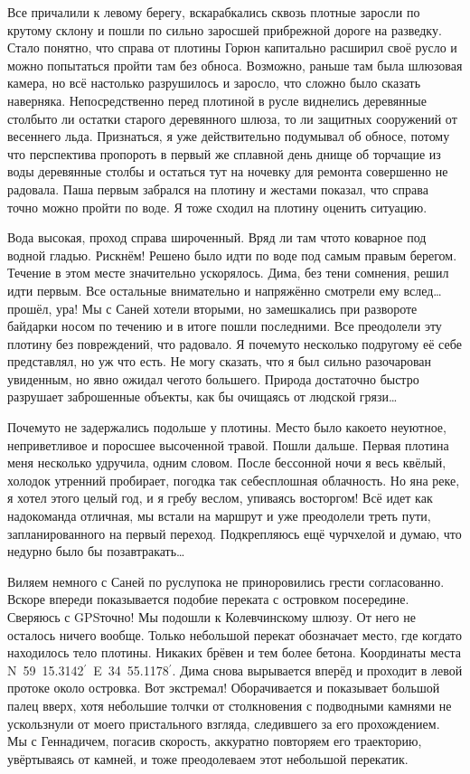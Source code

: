 Все причалили к левому берегу, вскарабкались сквозь плотные заросли по крутому склону и пошли по сильно заросшей прибрежной дороге на разведку. Стало понятно, что справа от плотины Горюн капитально расширил своё русло и можно попытаться пройти там без обноса. Возможно, раньше там была шлюзовая камера, но всё настолько разрушилось и заросло, что сложно было сказать наверняка. Непосредственно перед плотиной в русле виднелись деревянные столбы\mdash то ли остатки старого деревянного шлюза, то ли защитных сооружений от весеннего льда. Признаться, я уже действительно подумывал об обносе, потому что перспектива пропороть в первый же сплавной день днище об торчащие из воды деревянные столбы и остаться тут на ночевку для ремонта совершенно не радовала. Паша первым забрался на плотину и жестами показал, что справа точно можно пройти по воде. Я тоже сходил на плотину оценить ситуацию. 

Вода высокая, проход справа широченный. Вряд ли там что\sdash то коварное под водной гладью. Рискнём! Решено было идти по воде под самым правым берегом. Течение в этом месте значительно ускорялось. Дима, без тени сомнения, решил идти первым. Все остальные внимательно и напряжённо смотрели ему вслед\ldots прошёл, ура! Мы с Саней хотели вторыми, но замешкались при развороте байдарки носом по течению и в итоге пошли последними. Все преодолели эту плотину без повреждений, что радовало. Я почему\sdash то несколько по\sdash другому её себе представлял, но уж что есть. Не могу сказать, что я был сильно разочарован увиденным, но явно ожидал чего\sdash то большего. Природа достаточно быстро разрушает заброшенные объекты, как бы очищаясь от людской грязи\ldots

Почему\sdash то не задержались подольше у плотины. Место было какое\sdash то неуютное, неприветливое и поросшее высоченной травой. Пошли дальше. Первая плотина меня несколько удручила, одним словом. После бессонной ночи я весь квёлый, холодок утренний пробирает, погодка так себе\mdash сплошная облачность. Но я\mdash на реке, я хотел этого целый год, и я гребу веслом, упиваясь восторгом! Всё идет как надо\mdash команда отличная, мы встали на маршрут и уже преодолели треть пути, запланированного на первый переход. Подкрепляюсь ещё чурчхелой и думаю, что недурно было бы позавтракать\ldots 

Виляем немного с Саней по руслу\mdash пока не приноровились грести согласованно. Вскоре впереди показывается подобие переката с островком посередине. Сверяюсь с GPS\mdash точно! Мы подошли к Колевчинскому шлюзу. От него не осталось ничего вообще. Только небольшой перекат обозначает место, где когда\sdash то находилось тело плотины. Никаких брёвен и тем более бетона. Координаты места N~59\degree~15.3142$^\prime$~E~34\degree~55.1178$^\prime$. Дима снова вырывается вперёд и проходит в левой протоке около островка. Вот экстремал! Оборачивается и показывает большой палец вверх, хотя небольшие толчки от столкновения с подводными камнями не ускользнули от моего пристального взгляда, следившего за его прохождением. Мы с Геннадичем, погасив скорость, аккуратно повторяем его траекторию, увёртываясь от камней, и тоже преодолеваем этот небольшой перекатик. 

